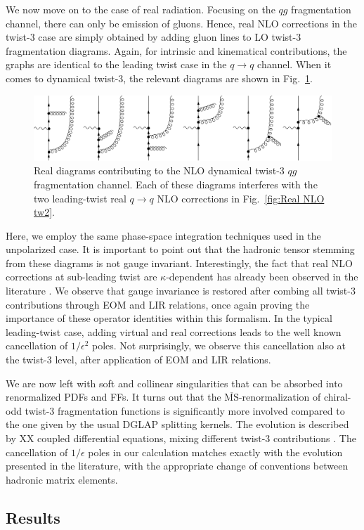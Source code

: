 We now move on to the case of real radiation. Focusing on the $qg$ fragmentation channel, there can only be emission of gluons. Hence, real NLO corrections in the twist-3 case are simply obtained by adding gluon lines to LO twist-3 fragmentation diagrams. Again, for intrinsic and kinematical contributions, the graphs are identical to the leading twist case in the $q\to q$ channel. When it comes to dynamical twist-3, the relevant diagrams are shown in Fig.~\ref{fig:Real NLO tw3}.
\begin{figure}
    \centering
    \includegraphics[width=0.99\linewidth]{fig/RealNLOTw3q2qg.png}
    \caption{Real diagrams contributing to the NLO dynamical twist-3 $qg$ fragmentation channel. Each of these diagrams interferes with the two leading-twist real $q \to q$ NLO corrections in Fig.~\ref{fig:Real NLO tw2}.}
    \label{fig:Real NLO tw3}
\end{figure}
Here, we employ the same phase-space integration techniques used in the unpolarized case. It is important to point out that the hadronic tensor stemming from these diagrams is not gauge invariant. Interestingly, the fact that real NLO corrections at sub-leading twist are $\kappa$-dependent has already been observed in the literature \cite{rein2025, Gamberg_2019}. We observe that gauge invariance is restored after combing all twist-3 contributions through EOM and LIR relations, once again proving the importance of these operator identities within this formalism. In the typical leading-twist case, adding virtual and real corrections leads to the well known cancellation of $1/\epsilon^2$ poles. Not surprisingly, we observe this cancellation also at the twist-3 level, after application of EOM and LIR relations.

We are now left with soft and collinear singularities that can be absorbed into renormalized PDFs and FFs. It turns out that the $\overline{\text{MS}}$-renormalization of chiral-odd twist-3 fragmentation functions is significantly more involved compared to the one given by the usual DGLAP splitting kernels. The evolution is described by XX coupled differential equations, mixing different twist-3 contributions \cite{Ma_2017}. The cancellation of $1/\epsilon$ poles in our calculation matches exactly with the evolution presented in the literature, with the appropriate change of conventions between hadronic matrix elements.

\subsection{Results}






